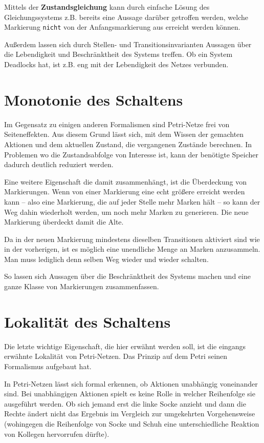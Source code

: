 Mittels der \textbf{Zustandsgleichung} kann durch einfache Lösung des Gleichungssystems z.B. bereits eine Aussage darüber getroffen werden, welche Markierung \texttt{nicht} von der Anfangsmarkierung aus erreicht werden können.

Außerdem lassen sich durch Stellen- und Transitionsinvarianten Aussagen über die Lebendigkeit und Beschränktheit des Systems treffen.
Ob ein System Deadlocks hat, ist z.B. eng mit der Lebendigkeit des Netzes verbunden.

\section{Monotonie des Schaltens}
Im Gegensatz zu einigen anderen Formalismen sind Petri-Netze frei von Seiteneffekten.
Aus diesem Grund lässt sich, mit dem Wissen der gemachten Aktionen und dem aktuellen Zustand, die vergangenen Zustände berechnen.
In Problemen wo die Zustandsabfolge von Interesse ist, kann der benötigte Speicher dadurch deutlich reduziert werden.

Eine weitere Eigenschaft die damit zusammenhängt, ist die Überdeckung von Markierungen.
Wenn von einer Markierung eine echt größere erreicht werden kann -- also eine Markierung, die auf jeder Stelle mehr Marken hält -- so kann der Weg dahin wiederholt werden, um noch mehr Marken zu generieren.
Die neue Markierung überdeckt damit die Alte.

Da in der neuen Markierung mindestens dieselben Transitionen aktiviert sind wie in der vorherigen, ist es möglich eine unendliche Menge an Marken anzusammeln.
Man muss lediglich denn selben Weg wieder und wieder schalten.

So lassen sich Aussagen über die Beschränktheit des Systems machen und eine ganze Klasse von Markierungen zusammenfassen.

\section{Lokalität des Schaltens}
Die letzte wichtige Eigenschaft, die hier erwähnt werden soll, ist die eingangs erwähnte Lokalität von Petri-Netzen.
Das Prinzip auf dem Petri seinen Formalismus aufgebaut hat.

In Petri-Netzen lässt sich formal erkennen, ob Aktionen unabhängig voneinander sind.
Bei unabhängigen Aktionen spielt es keine Rolle in welcher Reihenfolge sie ausgeführt werden.
Ob sich jemand erst die linke Socke anzieht und dann die Rechte ändert nicht das Ergebnis im Vergleich zur umgekehrten Vorgehensweise 
(wohingegen die Reihenfolge von Socke und Schuh eine unterschiedliche Reaktion von Kollegen hervorrufen dürfte).


